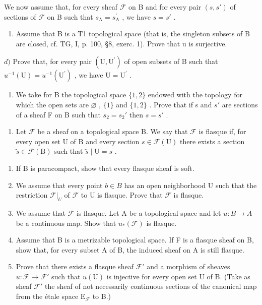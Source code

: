 We now assume that, for every sheaf \(\mathcal{F}\) on B and for every pair \((s,s')\) of sections of \(\mathcal{F}\) on B such that \(s_{\mathrm{A}} = s_{\mathrm{A}}^{\prime}\) , we have \(s = s'\) .

\begin{enumerate}
\def\labelenumi{\alph{enumi})}
\setcounter{enumi}{2}
\tightlist
\item
  Assume that B is a T1 topological space (that is, the singleton subsets of B are closed, cf. TG, I, p. 100, §8, exerc. 1). Prove that u is surjective.
\end{enumerate}

\(d)\) Prove that, for every pair \((\mathrm{U},\mathrm{U}^{\prime})\) of open subsets of B such that \(u^{-1}(\mathrm{U}) = u^{-1}(\mathrm{U}^{\prime})\) , we have \(\mathrm{U} = \mathrm{U}^{\prime}\) .

\begin{enumerate}
\def\labelenumi{\alph{enumi})}
\setcounter{enumi}{4}
\tightlist
\item
  We take for B the topological space \(\{1,2\}\) endowed with the topology for which the open sets are \(\varnothing\) , \(\{1\}\) and \(\{1,2\}\) . Prove that if s and \(s'\) are sections of a sheaf F on B such that \(s_{2}=s_{2}'\) then \(s=s'\) .
\end{enumerate}

\begin{enumerate}
\def\labelenumi{\arabic{enumi})}
\setcounter{enumi}{5}
\tightlist
\item
  Let \(\mathcal{F}\) be a sheaf on a topological space B. We say that \(\mathcal{F}\) is flasque if, for every open set U of B and every section \(s \in \mathcal{F}(\mathrm{U})\) there exists a section \(\widetilde{s} \in \mathcal{F}(\mathrm{B})\) such that \(\widetilde{s} \mid \mathrm{U} = s\) .
\end{enumerate}

\begin{enumerate}
\def\labelenumi{\alph{enumi})}
\item
  If B is paracompact, show that every flasque sheaf is soft.
\item
  We assume that every point \(b \in B\) has an open neighborhood U such that the restriction \(\mathcal{F}|_{U}\) of \(\mathcal{F}\) to U is flasque. Prove that \(\mathcal{F}\) is flasque.
\item
  We assume that \(\mathcal{F}\) is flasque. Let A be a topological space and let \(u\colon B\to A\) be a continuous map. Show that \(u_{*}(\mathcal{F})\) is flasque.
\item
  Assume that B is a metrizable topological space. If F is a flasque sheaf on B, show that, for every subset A of B, the induced sheaf on A is still flasque.
\item
  Prove that there exists a flasque sheaf \(\mathcal{F}'\) and a morphism of sheaves \(u\colon \mathcal{F}\to \mathcal{F}'\) such that \(u(\mathrm{U})\) is injective for every open set U of B. (Take as sheaf \(\mathcal{F}'\) the sheaf of not necessarily continuous sections of the canonical map from the étale space \(\mathrm{E}_{\mathcal{F}}\) to B.)
\end{enumerate}

